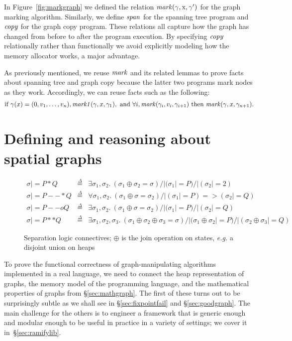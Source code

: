 \documentclass[acmsmall,review,anonymous]{acmart}\settopmatter{printfolios=true,printccs=false,printacmref=false}
\newcommand{\defeq}{\mathbin{\stackrel{\Delta}{=}}}
\newcommand{\tx}[1]{\text{#1}}
\begin{document}

{\color{magenta} In Figure~\ref{fig:markgraph} we defined the relation
$\m{mark}(\gamma, \tx x, \gamma')$
for the graph marking algorithm.  Similarly, we define $\mathit{span}$ for the
spanning tree program
and $\mathit{copy}$ for the graph copy program.
These relations all capture how the graph has changed from before to after the program
execution.  By specifying $\mathit{copy}$ relationally
rather than functionally we avoid explicitly modeling how the memory
allocator works, a major advantage.

As previously mentioned, we reuse $\mathit{mark}$ and its
related lemmas to prove facts about spanning tree and graph copy
because the latter two programs mark nodes as they work.
Accordingly, we can reuse facts such as the following:
\[
\begin{array}{@{}l@{}}
\text{if } \gamma(x)=(0, v_1, \dots,v_n), \m{mark1}(\gamma, x, \gamma_1),
\text{ and } \forall i, \m{mark}(\gamma_i,v_i,\gamma_{i+1}) \text{ then } \m{mark}(\gamma,x,\gamma_{n+1}).
\end{array}
\]
}
\fi
 
\section{Defining and reasoning about spatial graphs}
\label{sec:spacegraph}
\begin{figure}
\[
\begin{array}{lcl}
\sigma |= P * Q & \defeq & \exists \sigma_1, \sigma_2.~ (\sigma_1 \oplus \sigma_2 = \sigma) /| (\sigma_1 |= P) /| (\sigma_2 |= 2)\\
\sigma |= P --* Q & \defeq & \forall \sigma_1, \sigma_2.~ (\sigma_1 \oplus \sigma = \sigma_2) /| (\sigma_1 |= P) => (\sigma_2 |= Q) \\
\sigma |= P --o Q & \defeq & \exists \sigma_1, \sigma_2.~ (\sigma_1 \oplus \sigma = \sigma_2) /| (\sigma_1 |= P) /| (\sigma_2 |= Q) \\
\sigma |= P ** Q & \defeq & \exists \sigma_1, \sigma_2, \sigma_3.~ (\sigma_1 \oplus \sigma_2 \oplus \sigma_3 = \sigma) /| (\sigma_1 \oplus \sigma_2 |= P) /| (\sigma_2 \oplus \sigma_3 |= Q)
\end{array}
\]
\caption{Separation logic connectives; $\oplus$ is the join operation on states, \emph{e.g.} a disjoint union on heaps}
\label{fig:seplogsem}
\vspace*{-1em}
\end{figure}  
To prove the functional correctness of graph-manipulating algorithms implemented in a real language, we need to connect the heap representation of graphs, the memory model of the programming language, and the mathematical properties of graphs from \S\ref{sec:mathgraph}.  The first of these turns out to be surprisingly subtle as we shall see in \S\ref{sec:fixpointfail} and \S\ref{sec:goodgraph}.  The main challenge for the others is to engineer a framework that is generic enough and modular enough to be useful in practice in a variety of settings; we cover it in~\S\ref{sec:ramifylib}.
\end{document}
